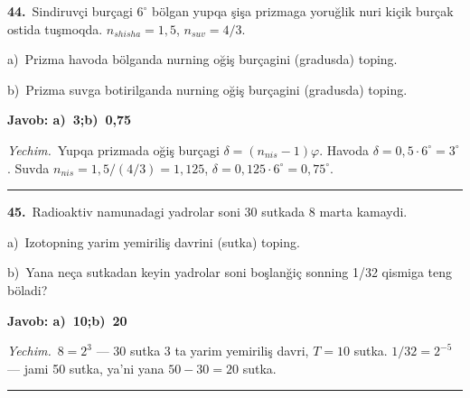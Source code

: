 \documentclass[11pt,a4paper]{article}
\begin{document}
\noindent\textbf{44.}\ Sindiruvçi burçagi $6^\circ$ bölgan yupqa şişa prizmaga yoruğlik nuri kiçik burçak ostida tuşmoqda. $n_{shisha}=1{,}5$, $n_{suv}=4/3$.\par
\noindent\hspace*{4mm}a)\ Prizma havoda bölganda nurning oğiş burçagini (gradusda) toping.\par
\noindent\hspace*{4mm}b)\ Prizma suvga botirilganda nurning oğiş burçagini (gradusda) toping.\par
\noindent\colorbox{gray!12}{\parbox{\dimexpr\linewidth-2\fboxsep}{\textbf{Javob: a)\ 3;\quad b)\ 0,75}}}\par\smallskip
\noindent\textit{Yechim.}\ Yupqa prizmada oğiş burçagi $\delta=(n_{nis}-1)\varphi$. Havoda $\delta=0{,}5\cdot6^\circ=3^\circ$. Suvda $n_{nis}=1{,}5/(4/3)=1{,}125$, $\delta=0{,}125\cdot6^\circ=0{,}75^\circ$.\par\par\medskip\hrule\medskip
{}\noindent\textbf{45.}\ Radioaktiv namunadagi yadrolar soni 30 sutkada 8 marta kamaydi.\par
\noindent\hspace*{4mm}a)\ Izotopning yarim yemiriliş davrini (sutka) toping.\par
\noindent\hspace*{4mm}b)\ Yana neça sutkadan keyin yadrolar soni boşlanğiç sonning 1/32 qismiga teng böladi?\par
\noindent\colorbox{gray!12}{\parbox{\dimexpr\linewidth-2\fboxsep}{\textbf{Javob: a)\ 10;\quad b)\ 20}}}\par\smallskip
\noindent\textit{Yechim.}\ $8=2^3$ — 30 sutka 3 ta yarim yemiriliş davri, $T=10$ sutka. $1/32=2^{-5}$ — jami 50 sutka, ya’ni yana $50-30=20$ sutka.\par\par\medskip\hrule\medskip
\end{document}
